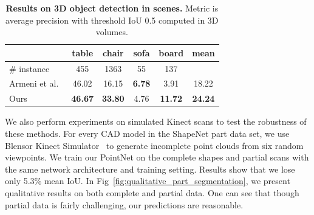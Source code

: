 \begin{table}[b!]
    \centering
    \small
    \begin{tabular}[width=\linewidth]{l|cccc|c}
    \hline
    ~                              & table & chair & sofa & board & mean  \\ \hline
    \# instance & 455 & 1363 & 55 & 137 & ~ \\ \hline
    Armeni et al.~\cite{armeni_cvpr16}          & 46.02 & 16.15 & \textbf{6.78} & 3.91  & 18.22 \\ \hline
    Ours & \textbf{46.67}     & \textbf{33.80 }    & 4.76    & \textbf{11.72}     & \textbf{24.24}     \\ \hline
    \end{tabular}
    \caption{\textbf{Results on 3D object detection in scenes.} Metric is average precision with threshold IoU 0.5 computed in 3D volumes.}
    \label{tab:3d_detection}
\end{table}



We also perform experiments on simulated Kinect scans to test the robustness of these methods. For every CAD model in the ShapeNet part data set, we use Blensor Kinect Simulator~\cite{Gschwandtner11b} to generate incomplete point clouds from six random viewpoints. We train our PointNet on the complete shapes and partial scans with the same network architecture and training setting. Results show that we lose only 5.3\% mean IoU. In Fig~\ref{fig:qualitative_part_segmentation}, we present qualitative results on both complete and partial data. One can see that though partial data is fairly challenging, our predictions are reasonable.



